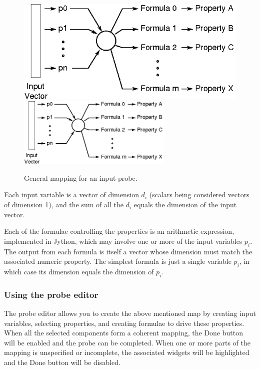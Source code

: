 \documentclass{article}
\begin{document}
\begin{figure}
\begin{center}
\iflatexml
\includegraphics[]{images/inputProbeMap}
\else
\includegraphics[width=0.66\textwidth]{images/inputProbeMap}
\fi
\end{center}
\caption{General mapping for an input probe.}%
\label{InputProbeMapFig}
\end{figure}

Each input variable is a vector of dimension $d_i$ (scalars being
considered vectors of dimension 1), and the sum of all the $d_i$ equals
the dimension of the input vector.

Each of the formulae controlling the properties is an arithmetic
expression, implemented in Jython, which may involve one or more of
the input variables $p_i$. The output from each formula is itself a vector
whose dimension must match the associated numeric property.
The simplest formula is just a single variable $p_i$, in which
case its dimension equals the dimension of $p_i$.

\subsubsection{Using the probe editor}

The probe editor allows you to create the above mentioned
map by creating input variables, selecting properties,
and creating formulae to drive these properties. When all the
selected components form a coherent mapping, the {\sf Done} button will be
enabled and the probe can be completed. When one or more parts of the
mapping is unspecified or incomplete, the associated widgets will be
highlighted and the {\sf Done} button will be disabled.
\end{document}
